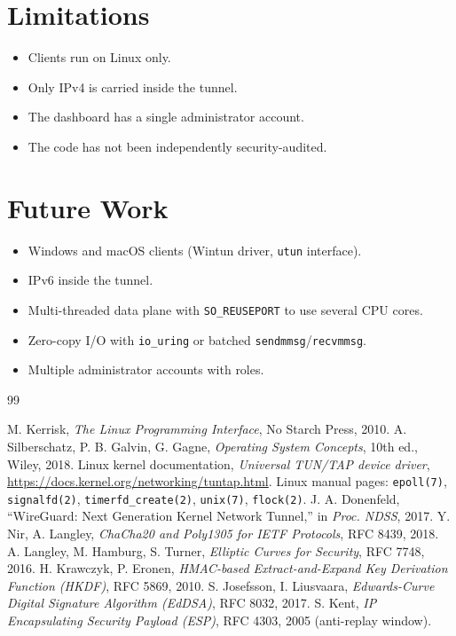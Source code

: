 \documentclass[12pt,a4paper]{report}
\begin{document}
\section{Limitations}
\begin{itemize}
  \item Clients run on Linux only.
  \item Only IPv4 is carried inside the tunnel.
  \item The dashboard has a single administrator account.
  \item The code has not been independently security-audited.
\end{itemize}

\section{Future Work}
\begin{itemize}
  \item Windows and macOS clients (Wintun driver, \texttt{utun} interface).
  \item IPv6 inside the tunnel.
  \item Multi-threaded data plane with \texttt{SO\_REUSEPORT} to use several CPU cores.
  \item Zero-copy I/O with \texttt{io\_uring} or batched \texttt{sendmmsg}/\texttt{recvmmsg}.
  \item Multiple administrator accounts with roles.
\end{itemize}

\renewcommand{\bibname}{References}
\begin{thebibliography}{99}
 M. Kerrisk, \emph{The Linux Programming Interface}, No Starch Press, 2010.
 A. Silberschatz, P. B. Galvin, G. Gagne, \emph{Operating System Concepts}, 10th ed., Wiley, 2018.
 Linux kernel documentation, \emph{Universal TUN/TAP device driver}, \url{https://docs.kernel.org/networking/tuntap.html}.
 Linux manual pages: \texttt{epoll(7)}, \texttt{signalfd(2)}, \texttt{timerfd\_create(2)}, \texttt{unix(7)}, \texttt{flock(2)}.
 J. A. Donenfeld, ``WireGuard: Next Generation Kernel Network Tunnel,'' in \emph{Proc. NDSS}, 2017.
 Y. Nir, A. Langley, \emph{ChaCha20 and Poly1305 for IETF Protocols}, RFC 8439, 2018.
 A. Langley, M. Hamburg, S. Turner, \emph{Elliptic Curves for Security}, RFC 7748, 2016.
 H. Krawczyk, P. Eronen, \emph{HMAC-based Extract-and-Expand Key Derivation Function (HKDF)}, RFC 5869, 2010.
 S. Josefsson, I. Liusvaara, \emph{Edwards-Curve Digital Signature Algorithm (EdDSA)}, RFC 8032, 2017.
 S. Kent, \emph{IP Encapsulating Security Payload (ESP)}, RFC 4303, 2005 (anti-replay window).
\end{thebibliography}
\end{document}
